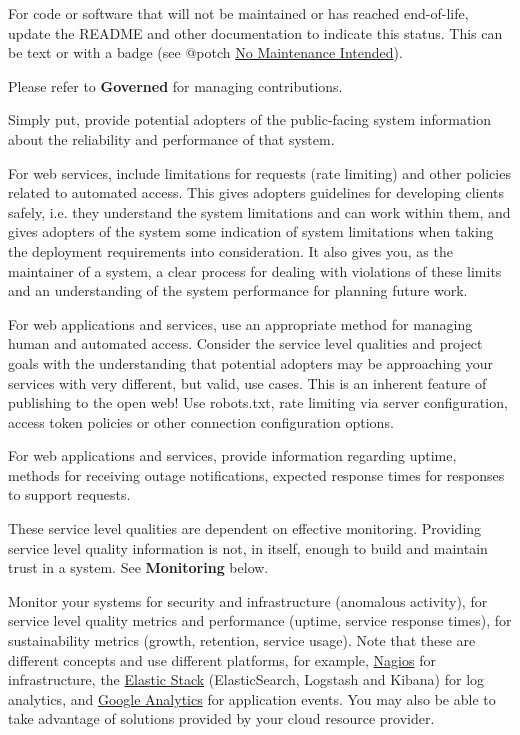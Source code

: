 \documentclass{article}
\newcounter{subsubsubsection}[subsubsection]
\begin{document}
For code or software that will not be maintained or has reached end-of-life, update the README  and other documentation to indicate this status. This can be text or with a badge (see @potch \href{http://unmaintained.tech/} {No Maintenance Intended}).
 
Please refer to \textbf{Governed} for managing contributions.

Simply put, provide potential adopters of the public-facing system information about the reliability and performance of that system. 
 
For web services, include limitations for requests (rate limiting) and other policies related to automated access. This gives adopters guidelines for developing clients safely, i.e. they understand the system limitations and can work within them, and gives adopters of the system some indication of system limitations when taking the deployment requirements into consideration. It also gives you, as the maintainer of a system, a clear process for dealing with violations of these limits and an understanding of the system performance for planning future work. 
 
For web applications and services, use an appropriate method for managing human and automated access. Consider the service level qualities and project goals with the understanding that potential adopters may be approaching your services with very different, but valid, use cases. This is an inherent feature of publishing to the open web! Use robots.txt, rate limiting via server configuration, access token policies or other connection configuration options.
 
For web applications and services, provide information regarding uptime, methods for receiving outage notifications, expected response times for responses to support requests.
 
These service level qualities are dependent on effective monitoring. Providing service level quality information is not, in itself, enough to build and maintain trust in a system. See \textbf{Monitoring} below. 

Monitor your systems for security and infrastructure (anomalous activity), for service level quality metrics and performance (uptime, service response times), for sustainability metrics (growth, retention, service usage). Note that these are different concepts and use different platforms, for example, \href{https://www.nagios.org/} {Nagios} for infrastructure, the \href{https://www.elastic.co/products} {Elastic Stack} (ElasticSearch, Logstash and Kibana) for log analytics, and \href{https://www.google.com/analytics/#?modal_active=none} {Google Analytics} for application events. You may also be able to take advantage of solutions provided by your cloud resource provider. 
 
\end{document}
